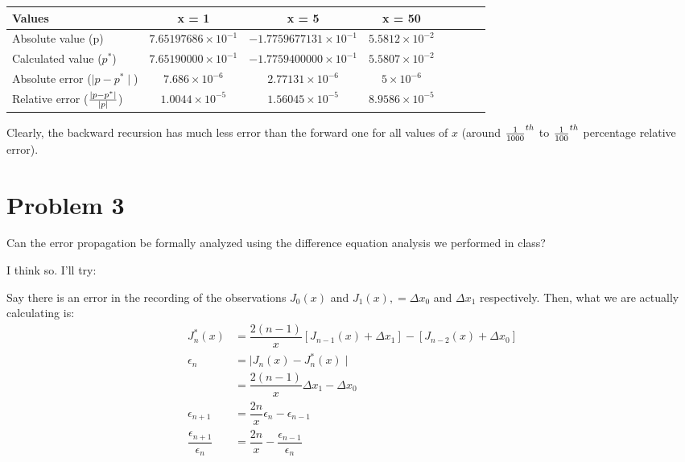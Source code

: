 \documentclass[12pt,letterpaper]{article}
\begin{document}
\begin{center}
\begin{tabular}{l*{6}{c}r}
\hline
Values 	            	& x = 1 & x = 5 & x = 50\\
\hline
Absolute value (p) 								& $7.65197686 \times 10^{-1}$ 	& $-1.7759677131 \times 10^{-1}$ 	& $5.5812 \times 10^{-2}$  \\
Calculated value ($p^*$)        						& $7.65190000 \times 10^{-1}$ 	& $-1.7759400000 \times 10^{-1}$	& $5.5807 \times 10^{-2}$ \\
Absolute error ($\mid p - p^* \mid$)          				& $7.686 \times 10^{-6}$		& $2.77131 \times 10^{-6}$		& $5 \times 10^{-6}$ \\
\hline
Relative error ($\mid p - p^* \mid \over \mid p \mid$)    	& $1.0044 \times 10^{-5}$ 	& $1.56045 \times 10^{-5}$		& $8.9586 \times 10^{-5}$ \\
\hline
\end{tabular}
\end{center}

Clearly, the backward recursion has much less error than the forward one for all values of $x$ (around ${1 \over 1000}^{th}$ to ${1 \over 100}^{th}$ percentage relative error).


\newpage
\section*{Problem 3}

Can the error propagation be formally analyzed using the difference equation analysis we performed in class? \par
I think so. I'll try: \par
Say there is an error in the recording of the observations $J_0(x)$ and $J_1(x), = \Delta x_0$ and $\Delta x_1$ respectively.
Then, what we are actually calculating is: \\
\begin{align*}
J_n^*(x) &= \dfrac{2(n-1)}{x} [J_{n-1}(x) + \Delta x_1] - [J_{n-2}(x) + \Delta x_0] \\
\epsilon_n & = \mid J_n(x) - J_n^*(x) \mid \\
&= \dfrac{2(n-1)}{x} \Delta x_1 - \Delta x_0 \\
\epsilon_{n+1} &= \dfrac{2n}{x} \epsilon_n - \epsilon_{n-1} \\
\dfrac{\epsilon_{n+1}}{\epsilon_n} &= \dfrac{2n}{x} - \dfrac{\epsilon_{n-1}}{\epsilon_n}\\
\end{align*}
\end{document}
